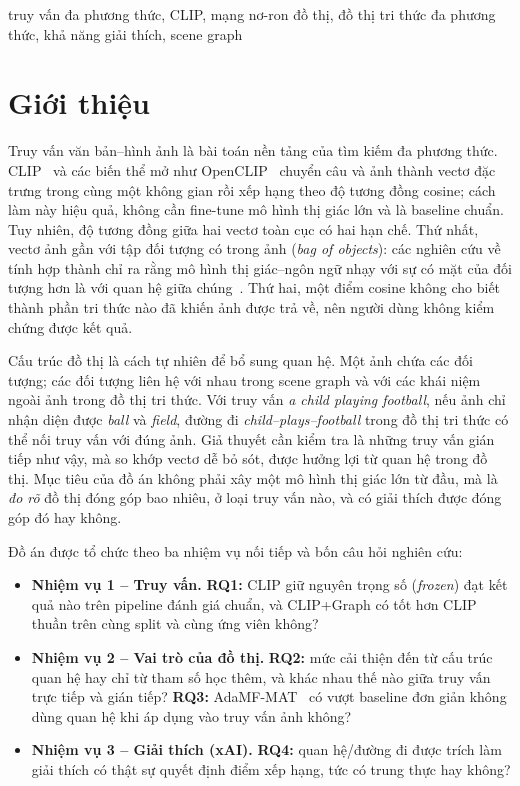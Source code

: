 \documentclass[conference]{IEEEtran}
\begin{document}
\begin{IEEEkeywords}
truy vấn đa phương thức, CLIP, mạng nơ-ron đồ thị, đồ thị tri thức đa phương thức, khả năng giải thích, scene graph
\end{IEEEkeywords}

\section{Giới thiệu}\label{sec:intro}
Truy vấn văn bản--hình ảnh là bài toán nền tảng của tìm kiếm đa phương thức. CLIP~\cite{clip} và các biến thể mở như OpenCLIP~\cite{openclip} chuyển câu và ảnh thành vectơ đặc trưng trong cùng một không gian rồi xếp hạng theo độ tương đồng cosine; cách làm này hiệu quả, không cần fine-tune mô hình thị giác lớn và là baseline chuẩn. Tuy nhiên, độ tương đồng giữa hai vectơ toàn cục có hai hạn chế. Thứ nhất, vectơ ảnh gần với tập đối tượng có trong ảnh (\emph{bag of objects}): các nghiên cứu về tính hợp thành chỉ ra rằng mô hình thị giác--ngôn ngữ nhạy với sự có mặt của đối tượng hơn là với quan hệ giữa chúng~\cite{bagofwords,winoground}. Thứ hai, một điểm cosine không cho biết thành phần tri thức nào đã khiến ảnh được trả về, nên người dùng không kiểm chứng được kết quả.

Cấu trúc đồ thị là cách tự nhiên để bổ sung quan hệ. Một ảnh chứa các đối tượng; các đối tượng liên hệ với nhau trong scene graph và với các khái niệm ngoài ảnh trong đồ thị tri thức. Với truy vấn \emph{a child playing football}, nếu ảnh chỉ nhận diện được \emph{ball} và \emph{field}, đường đi \emph{child--plays--football} trong đồ thị tri thức có thể nối truy vấn với đúng ảnh. Giả thuyết cần kiểm tra là những truy vấn gián tiếp như vậy, mà so khớp vectơ dễ bỏ sót, được hưởng lợi từ quan hệ trong đồ thị. Mục tiêu của đồ án không phải xây một mô hình thị giác lớn từ đầu, mà là \emph{đo rõ} đồ thị đóng góp bao nhiêu, ở loại truy vấn nào, và có giải thích được đóng góp đó hay không.

Đồ án được tổ chức theo ba nhiệm vụ nối tiếp và bốn câu hỏi nghiên cứu:
\begin{itemize}
\item \textbf{Nhiệm vụ 1 -- Truy vấn.} \textbf{RQ1:} CLIP giữ nguyên trọng số (\emph{frozen}) đạt kết quả nào trên pipeline đánh giá chuẩn, và CLIP+Graph có tốt hơn CLIP thuần trên cùng split và cùng ứng viên không?
\item \textbf{Nhiệm vụ 2 -- Vai trò của đồ thị.} \textbf{RQ2:} mức cải thiện đến từ cấu trúc quan hệ hay chỉ từ tham số học thêm, và khác nhau thế nào giữa truy vấn trực tiếp và gián tiếp? \textbf{RQ3:} AdaMF-MAT~\cite{adamf} có vượt baseline đơn giản không dùng quan hệ khi áp dụng vào truy vấn ảnh không?
\item \textbf{Nhiệm vụ 3 -- Giải thích (xAI).} \textbf{RQ4:} quan hệ/đường đi được trích làm giải thích có thật sự quyết định điểm xếp hạng, tức có trung thực hay không?
\end{itemize}
\end{document}
